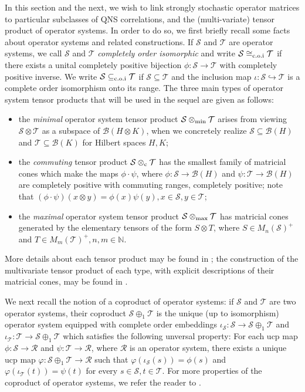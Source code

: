 \documentclass[11pt]{amsart}
\newcommand{\cl}[1]{\mathcal{#1}}
\newcommand{\bb}[1]{\mathbb{#1}}
\begin{document}
In this section and the next, we wish to link strongly stochastic operator matrices to particular subclasses of QNS correlations, and the (multi-variate) tensor product of operator systems. In order to do so, we first briefly recall some facts about operator systems and related constructions. If $\cl{S}$ and $\cl{T}$ are operator systems, we call $\cl{S}$ and $\cl{T}$ \textit{completely order isomorphic} and write $\cl{S} \cong_{\rm c.o.i} \cl{T}$ if there exists a unital completely positive bijection $\phi: \cl{S}\rightarrow \cl{T}$ with completely positive inverse. We write $\cl{S} \subseteq_{\rm c.o.i} \cl{T}$ if $\cl{S} \subseteq \cl{T}$ and the inclusion map $\iota: \cl{S}\hookrightarrow \cl{T}$ is a complete order isomorphism onto its range. The three main types of operator system tensor products that will be used in the sequel are given as follows:
\begin{itemize}
	\item[(i)] the \textit{minimal} operator system tensor product $\cl{S}\otimes_{\rm min} \cl{T}$ arises from viewing $\cl{S}\otimes \cl{T}$ as a subspace of $\cl{B}(H\otimes K)$, when we concretely realize $\cl{S} \subseteq \cl{B}(H)$ and $\cl{T} \subseteq \cl{B}(K)$ for Hilbert spaces $H, K$;
	\item[(ii)] the \textit{commuting} tensor product $\cl{S}\otimes_{\rm c} \cl{T}$ has the smallest family of matricial cones which make the maps $\phi\cdot \psi$, where $\phi: \cl{S}\rightarrow \cl{B}(H)$ and $\psi: \cl{T}\rightarrow \cl{B}(H)$ are completely positive with commuting ranges, completely positive; note that $(\phi\cdot \psi)(x\otimes y) = \phi(x)\psi(y), x \in \cl{S}, y \in \cl{T}$;
	\item[(iii)] the \textit{maximal} operator system tensor product $\cl{S}\otimes_{\rm max} \cl{T}$ has matricial cones generated by the elementary tensors of the form $S\otimes T$, where $S \in M_{n}(\cl{S})^{+}$ and $T \in M_{m}(\cl{T})^{+}, n, m \in \bb{N}$.
\end{itemize}
\noindent More details about each tensor product may be found in \cite{kptt}; the construction of the multivariate tensor product of each type, with explicit descriptions of their matricial cones, may be found in \cite[Section 7]{gt_one}. 

We next recall the notion of a coproduct of operator systems: if $\cl{S}$ and $\cl{T}$ are two operator systems, their coproduct $\cl{S} \oplus_{1} \cl{T}$ is the unique (up to isomorphism) operator system equipped with complete order embeddings $\iota_{\cl{S}}: \cl{S}\rightarrow \cl{S}\oplus_{1} \cl{T}$ and $\iota_{\cl{T}}: \cl{T}\rightarrow \cl{S}\oplus_{1}\cl{T}$ which satisfies the following unversal property: For each ucp map $\phi: \cl{S}\rightarrow \cl{R}$ and $\psi: \cl{T}\rightarrow \cl{R}$, where $\cl{R}$ is an operator system, there exists a unique ucp map $\varphi: \cl{S}\oplus_{1}\cl{T}\rightarrow \cl{R}$ such that $\varphi(\iota_{\cl{S}}(s)) = \phi(s)$ and $\varphi(\iota_{\cl{T}}(t)) = \psi(t)$ for every $s \in \cl{S}, t \in \cl{T}$. For more properties of the coproduct of operator systems, we refer the reader to \cite[Section 8]{kavruk}.
\end{document}
